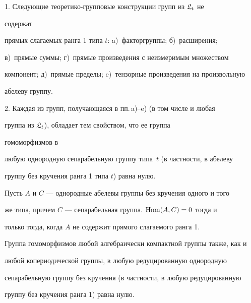  


\begin{cor} 


1. Следующие теоретико-групповые конструкции групп из $\frak L_t$ не 


содержат 


прямых слагаемых ранга 1 типа $t$: a)~факторгруппы; б)~расширения; 


в)~прямые суммы; г)~прямые произведения с неизмеримым множеством 


компонент; д)~прямые пределы; e)~тензорные произведения на произвольную 


абелеву группу. 


 


2. Каждая из групп, получающаяся в пп.\,a)--e) (в том числе и любая 


группа из $\frak L_t$), обладает тем свойством, что ее группа 


гомоморфизмов в 


любую однородную сепарабельную группу типа~$t$ (в частности, в абелеву 


группу без кручения ранга 1 типа $t$) равна нулю. 


\end{cor} 


 


\begin{cor} 


Пусть $A$ и $C$ --- однородные абелевы группы без кручения одного и того 


же типа, причем $C$ --- сепарабельная группа.\; $\operatorname{Hom}(A,C)=0$ тогда и 


только тогда, когда $A$ не содержит прямого слагаемого ранга 1. 


\end{cor} 


 


\begin{cor} 


Группа гомоморфизмов любой алгебраически компактной группы также, как и 


любой копериодической группы, в любую редуцированную однородную 


сепарабельную группу без кручения (в частности, в любую редуцированную 


группу без кручения ранга 1) равна нулю. 


\end{cor} 


